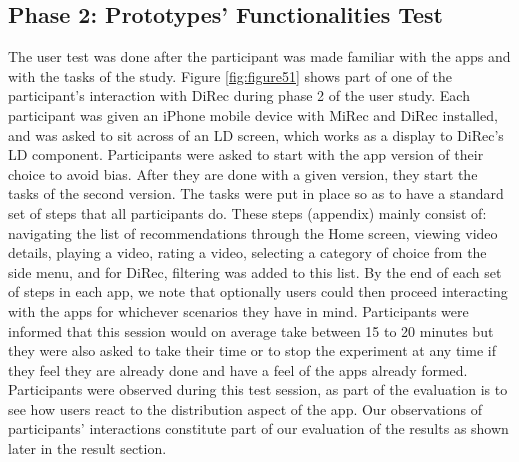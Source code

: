 \subsection{Phase 2: Prototypes' Functionalities Test}
The user test was done after the participant was made familiar with the apps and
with the tasks of the study. Figure \ref{fig:figure51} shows part of one of the
participant's interaction with DiRec during phase 2 of the user study. Each
participant was given an iPhone mobile device with MiRec and DiRec installed, and was asked to sit across of an LD screen, which works as a display to DiRec's LD component.
Participants were asked to start with the app version of their choice to avoid
bias. After they are done with a given version, they start the tasks of the
second version. The tasks were put in place so as to have a standard set of
steps that all participants do. These steps (appendix) mainly consist of:
navigating the list of recommendations through the Home screen, viewing video details, playing
a video, rating a video, selecting a category of choice from the side menu, and
for DiRec, filtering was added to this list. By the end of each set of steps in
each app, we note that optionally users could then proceed interacting with the
apps for whichever scenarios they have in mind. Participants were informed that
this session would on average take between 15 to 20 minutes but they were also
asked to take their time or to stop the experiment at any time if they feel they
are already done and have a feel of the apps already formed. Participants were
observed during this test session, as part of the evaluation is to see how users react to the distribution aspect of the app.
Our observations of participants' interactions constitute part of our evaluation
of the results as shown later in the result section.

